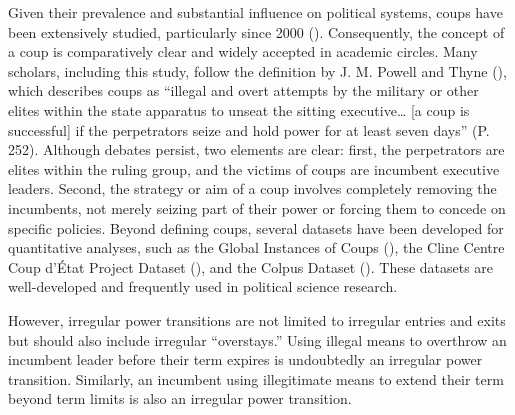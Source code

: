 \documentclass[
  12pt,
]{report}
\begin{document}
Given their prevalence and substantial influence on political systems,
coups have been extensively studied, particularly since 2000
(). Consequently, the
concept of a coup is comparatively clear and widely accepted in academic
circles. Many scholars, including this study, follow the definition by
J. M. Powell and Thyne (), which
describes coups as ``illegal and overt attempts by the military or other
elites within the state apparatus to unseat the sitting
executive\ldots{} {[}a coup is successful{]} if the perpetrators seize
and hold power for at least seven days'' (P. 252). Although debates
persist, two elements are clear: first, the perpetrators are elites
within the ruling group, and the victims of coups are incumbent
executive leaders. Second, the strategy or aim of a coup involves
completely removing the incumbents, not merely seizing part of their
power or forcing them to concede on specific policies. Beyond defining
coups, several datasets have been developed for quantitative analyses,
such as the Global Instances of Coups (), the Cline Centre Coup d'État Project Dataset
(), and the Colpus Dataset
(). These datasets
are well-developed and frequently used in political science research.

However, irregular power transitions are not limited to irregular
entries and exits but should also include irregular ``overstays.'' Using
illegal means to overthrow an incumbent leader before their term expires
is undoubtedly an irregular power transition. Similarly, an incumbent
using illegitimate means to extend their term beyond term limits is also
an irregular power transition.
\end{document}
